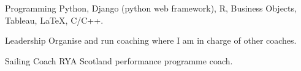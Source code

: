 

\begin{cvskills}

  \cvskill
    {Programming} %
    {Python, Django (python web framework), R, Business Objects, Tableau, LaTeX, C/C++.} %

  \cvskill
    {Leadership} %
    {Organise and run coaching where I am in charge of other coaches.} %

  \cvskill
    {Sailing Coach} %
    {RYA Scotland performance programme coach.}


\end{cvskills}
